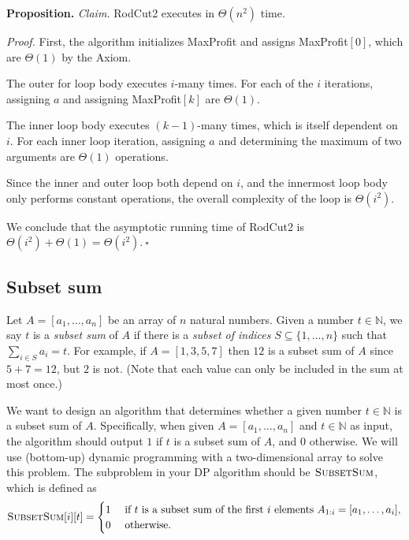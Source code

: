 \begin{enumerate}[resume]
\begin{solution}
\textbf{Proposition. }\textit{Claim. }{\sc RodCut2} executes in $\Theta(n^2)$ time.

\textit{Proof. }First, the algorithm initializes {\sc MaxProfit} and assigns {\sc MaxProfit}$[0]$, which are $\Theta(1)$ by the Axiom.

The outer for loop body executes $i$-many times. For each of the $i$ iterations, assigning $a$ and assigning {\sc MaxProfit}$[k]$ are $\Theta(1)$.

The inner loop body executes $(k-1)$-many times, which is itself dependent on $i$. For each inner loop iteration, assigning $a$ and determining the maximum of two arguments are $\Theta(1)$ operations.

Since the inner and outer loop both depend on $i$, and the innermost loop body only performs constant operations, the overall complexity of the loop is $\Theta(i^2)$.

We conclude that the asymptotic running time of {\sc RodCut2} is $\Theta(i^2)+\Theta(1)=\Theta(i^2)$.$~\square$
\end{solution}
\end{enumerate}
\newpage
\subsection{Subset sum}
Let $A = [a_1, \ldots, a_n]$ be an array of $n$ natural numbers. Given a number $t \in \mathbb{N}$, we say $t$ is a \emph{subset sum} of $A$ if there is a \emph{subset of indices} $S \subseteq \{1,\ldots,n\}$ such that $\sum_{i \in S} a_i = t$. For example, if $A=[1,3,5,7]$ then $12$ is a subset sum of $A$ since $5+7=12$, but $2$ is not. (Note that each value can only be included in the sum at most once.)

We want to design an algorithm that determines whether a given number $t \in \mathbb{N}$ is a subset sum of $A$. Specifically, when given $A = [a_1,\ldots,a_n]$ and $t \in \mathbb{N}$ as input, the algorithm should output $1$ if $t$ is a subset sum of $A$, and $0$ otherwise.
We will use (bottom-up) dynamic programming with a two-dimensional array to solve this problem. The subproblem in your DP algorithm should be $\textsc{SubsetSum}$, which is defined as
\begin{align*}
\textsc{SubsetSum}[i][t] = 
\begin{cases} 
    1 &\text{ if $t$ is a subset sum of the first $i$ elements $A_{1:i}=[a_1,\ldots,a_i]$,} \\
    0 &\text{ otherwise.}
\end{cases}
\end{align*}

